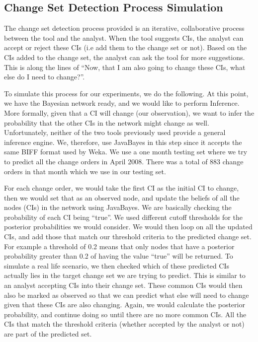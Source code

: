 \documentclass{article}
\begin{document}
\subsection{Change Set Detection Process Simulation}

The change set detection process provided is an iterative, collaborative process between the tool and the analyst. When the tool suggests CIs, the analyst can
accept or reject these CIs (i.e add them to the change set or not). Based on the CIs added to the change set, the analyst can ask the tool for more
suggestions. This is along the lines of ``Now, that I am also going to change these CIs, what else do I need to change?''.

To simulate this process for our experiments, we do the following. At this point, we have the Bayesian network ready, and we would like to perform Inference.
More formally, given that a CI will change (our observation), we want to infer the probability that the other CIs in the network might change as well.
Unfortunately, neither of the two tools previously used provide a general inference engine. We, therefore, use JavaBayes in this step since it accepts
the same BIFF format used by Weka. We use a one month testing set where we try to predict all the change orders in April 2008. There was a total of
883 change orders in that month which we use in our testing set. 

For each change order, we would take the first CI as the initial CI to change, then we would set that as an observed node, and update
the beliefs of all the nodes (CIs) in the network using JavaBayes. We are basically checking the probability of each CI being ``true''. We used different
cutoff thresholds for the posterior probabilities we would consider. We would then loop on all the updated CIs, and add those that match our threshold criteria
to
the predicted change set. For example a threshold of 0.2 means that only nodes that have a posterior probability greater than 0.2 of having the value ``true''
will be returned. To simulate a real life scenario, we then checked which of these predicted CIs actually lies in the target change set we are trying to
predict. This is similar to an analyst accepting CIs into their change set. These common CIs would then also be marked as observed so that we can predict
what else will need to change given that these CIs are also changing. Again, we would calculate the posterior probability, and continue doing
so until there are no more common CIs. All the CIs that match the threshold criteria (whether accepted by the analyst or not) are part of the predicted
set.
\end{document}
